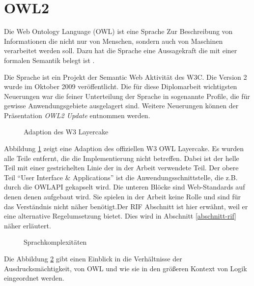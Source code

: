\section{OWL2}
\label{abschnitt-owl2}

Die Web Ontology Language (OWL) ist eine Sprache Zur Beschreibung von Informationen die nicht nur von Menschen, sondern auch von Maschinen verarbeitet werden soll. Dazu hat die Sprache eine Aussagekraft die mit einer formalen Semantik belegt ist \cite{OWLWG}.

Die Sprache ist ein Projekt der Semantic Web Aktivität des W3C. Die Version 2 wurde im Oktober 2009 veröffentlicht. Die für diese Diplomarbeit wichtigsten Neuerungen war die feiner Unterteilung der Sprache in sogenannte Profile, die für gewisse Anwendungsgebiete ausgelagert sind. Weitere Neuerungen können der Präsentation \emph{OWL2 Update} \cite{Golbreich2008} entnommen werden.

\begin{figure}[htb]
	\caption{Adaption des W3 Layercake\cite{W3SWLayerCake}}
	\label{image-w3-layercake}
	\begin{center}
	\end{center}
\end{figure}


Abbildung \ref{image-w3-layercake} zeigt eine Adaption des offiziellen W3 OWL Layercake\cite{W3SWLayerCake}. Es wurden alle Teile entfernt, die die Implementierung nicht betreffen. Dabei ist der helle Teil mit einer gestrichelten Linie der in der Arbeit verwendete Teil. Der obere Teil ``User Interface \& Applications'' ist die Anwendungsschnittstelle, die z.B. durch die OWLAPI gekapselt wird. Die unteren Blöcke sind Web-Standards auf denen denen aufgebaut wird. Sie spielen in der Arbeit keine Rolle und sind für das Verständnis nicht näher benötigt.Der RIF Abschnitt ist hier erwähnt, weil er eine alternative Regelumsetzung bietet. Dies wird in Abschnitt \ref{abschnitt-rif} näher erläutert.

\begin{figure}[htb]
	\caption{Sprachkomplexitäten}
	\label{image-sprachhierarchie}
	\begin{center}
	\end{center}
\end{figure}

Die Abbildung \ref{image-sprachhierarchie} gibt einen Einblick in die Verhältnisse der Ausdrucksmächtigkeit, von OWL und wie sie in den größeren Kontext von Logik eingeordnet werden.

